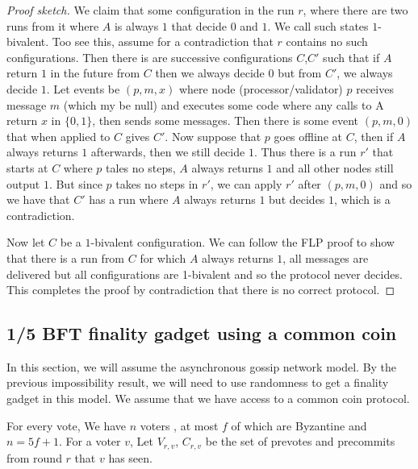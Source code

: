 \documentclass{article}
\begin{document}
{\begin{proof}[Proof sketch]
We claim that some configuration in the run $r$, where there are two runs from it where $A$ is always $1$ that decide $0$ and $1$. We call such states $1$-bivalent. Too see this, assume for a contradiction that $r$ contains no such configurations. Then there is are successive configurations $C$,$C'$ such that if $A$ return $1$ in the future from $C$ then we always decide $0$ but from $C'$, we always decide $1$.  Let events be $(p,m,x)$ where node (processor/validator) $p$ receives message $m$ (which my be null) and executes some code where any calls to A return $x$ in $\{0,1\}$, then sends some messages. Then there is some event $(p,m,0)$ that when applied to $C$ gives $C'$. Now suppose that $p$ goes offline at $C$, then if $A$ always returns $1$ afterwards, then we still decide $1$. Thus there is a run $r'$ that starts at $C$ where $p$ tales no steps, $A$ always returns $1$ and all other nodes still output $1$.
But since $p$ takes no steps in $r'$, we can apply $r'$ after $(p, m, 0)$ and so we have that $C'$ has a run where $A$ always returns $1$ but decides $1$, which is a contradiction.

Now let $C$ be a $1$-bivalent configuration. We can follow the FLP proof to show that there is a run from $C$ for which $A$ always returns $1$, all messages are delivered but all configurations are 1-bivalent and so the protocol never decides. This completes the proof by contradiction that there is no correct protocol.
\end{proof}

\subsection{1/5 BFT finality gadget using a common coin}




In this section, we will assume the asynchronous gossip network model. By the previous impossibility result, we will need to use randomness to get a finality gadget in this model. We assume that we have access to a common coin protocol.


For every vote, We have $n$ voters , at most $f$ of which are Byzantine and $n = 5f+1$.  For a voter $v$, Let $V_{r,v}$, $C_{r,v}$ be the set of prevotes and precommits from round $r$ that $v$ has seen.

}
\end{document}
